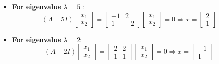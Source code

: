 \begin{frame}{}
    \begin{itemize}
       \item \textbf{For eigenvalue } \( \lambda = 5 \) :
\[
(A - 5I) \begin{bmatrix}
    x_1\\x_2
\end{bmatrix} = \begin{bmatrix} -1 & 2 \\ 1 & -2 \end{bmatrix}\begin{bmatrix}
    x_1\\x_2
\end{bmatrix}=0 
\Longrightarrow x = \begin{bmatrix} 2 \\ 1 \end{bmatrix}
\]
\vspace{0.5em}
\item \textbf{For eigenvalue } \( \lambda = 2 \):
\[
(A - 2I) \begin{bmatrix}
    x_1\\x_2
\end{bmatrix} = \begin{bmatrix} 2 & 2 \\ 1 & 1 \end{bmatrix} \begin{bmatrix}
    x_1\\x_2
\end{bmatrix} = 0
\Longrightarrow x = \begin{bmatrix} -1 \\ 1 \end{bmatrix}
\]
 \end{itemize}
\end{frame}



